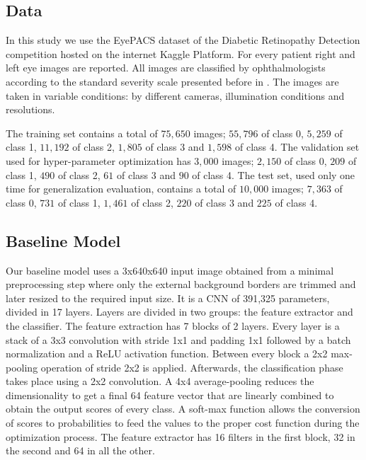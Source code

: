 \documentclass{llncs}
\begin{document}
\subsection{Data}

In this study we use the EyePACS dataset of the Diabetic Retinopathy Detection competition hosted on the internet Kaggle Platform.  For every patient right and left eye images are reported. All images are classified by ophthalmologists according to the standard severity scale presented before in \cite{diaclass}. The images are taken in variable conditions: by different cameras, illumination conditions and resolutions. 

The training set contains a total of $75,650$ images; $55,796$ of class 0, $5,259$ of class 1, $11,192$ of class 2, $1,805$ of class 3 and $1,598$ of class 4. The validation set used for hyper-parameter optimization has $3,000$ images; $2,150$ of class 0, $209$ of class 1, $490$ of class 2, $61$ of class 3 and $90$ of class 4. The test set, used only one time for generalization evaluation, contains a total of $10,000$ images; $7,363$ of class 0, $731$ of class 1, $1,461$ of class 2, $220$ of class 3 and $225$ of class 4. 

\subsection{Baseline Model}

Our baseline model \cite{blind} uses a 3x640x640 input image obtained from a minimal preprocessing step where only the external background borders are trimmed and later resized to the required input size. It is a CNN of 391,325 parameters, divided in 17 layers. Layers are divided in two groups: the feature extractor and the classifier. The feature extraction has 7 blocks of 2 layers. Every layer is a stack of a 3x3 convolution with stride 1x1 and padding 1x1 followed by a batch normalization and a ReLU activation function. Between every block a 2x2 max-pooling operation of stride 2x2 is applied.  Afterwards, the classification phase takes place using a 2x2 convolution. A 4x4 average-pooling reduces the dimensionality to get a final 64 feature vector that are linearly combined to obtain the output scores of every class. A soft-max function allows the conversion of scores to probabilities to feed the values to the proper cost function during the optimization process. The feature extractor has 16 filters in the first block, 32 in the second and 64 in all the other.
\end{document}
